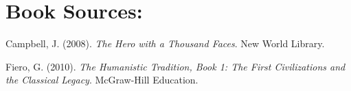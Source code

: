 \documentclass[12pt,a4paper,english]{article}
\begin{document}
\section*{Book Sources:}
\begin{hangparas}{2em}{1}
  Campbell, J. (2008). \emph{The Hero with a Thousand Faces}. New World Library.
  \par
  Fiero, G. (2010). \emph{The Humanistic Tradition, Book 1: The First Civilizations and the Classical Legacy}. McGraw-Hill Education.
\end{hangparas}
\par
\fussy
\end{document}
